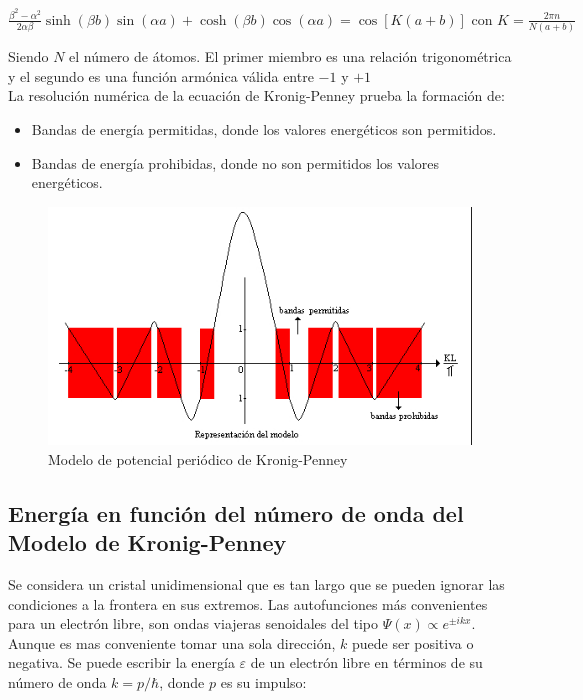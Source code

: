 \documentclass[oneside]{book}
\numberwithin{equation}{section}
\numberwithin{figure}{section}
\numberwithin{table}{section}
\begin{document}
				\begin{center}
					$\displaystyle \frac{\beta^2-\alpha^2}{2\alpha\beta}\sinh(\beta b)\sin(\alpha a)+\cosh(\beta b)\cos(\alpha a)=\cos[K(a+b)] \text{ con } K=\frac{2\pi n}{N(a+b)}$
				\end{center}
							
				Siendo	$N$ el número de átomos. El primer miembro es una relación trigonométrica y el segundo es una función armónica válida entre $-1$ y $+1$\\
				
				La resolución numérica de la ecuación de Kronig-Penney prueba la formación de:
				
				\begin{itemize}		
					\item Bandas de energía permitidas, donde los valores energéticos son permitidos.
					\item Bandas de energía prohibidas, donde no son permitidos los valores energéticos.								
				\end{itemize}											
							
				\begin{figure}[H]
					\begin{center}
						\includegraphics[scale=1]{KP.jpg}
						\caption{Modelo de potencial periódico de Kronig-Penney}
					\end{center}					
				\end{figure}		
			
			\subsection{Energía en función del número de onda del Modelo de Kronig-Penney}
			
			Se considera un cristal unidimensional que es tan largo que se pueden ignorar las condiciones a la frontera en sus extremos. Las autofunciones más convenientes para un electrón libre, son ondas viajeras senoidales del tipo $\Psi(x) \propto e^{\pm i k x}$. Aunque es mas conveniente tomar una sola dirección, $k$ puede ser positiva o negativa. Se puede escribir la energía $\varepsilon$ de un electrón libre en términos de su número de onda $k=p/\hbar$, donde $p$ es su impulso:
			
\end{document}
